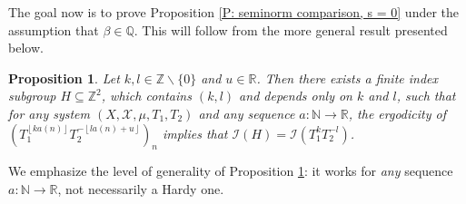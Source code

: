 \documentclass[11pt]{amsart}
\newtheorem{proposition}[lemma]{Proposition}
\theoremstyle{definition}
\newcommand{\N}{{\mathbb N}}
\newcommand{\Q}{{\mathbb Q}}
\newcommand{\R}{{\mathbb R}}
\newcommand{\CI}{{\mathcal I}}
\newcommand{\CX}{{\mathcal X}}
\newcommand{\1}{{\mathbf{1}}}
\newcommand{\floor}[1]{{\left \lfloor #1 \right \rfloor}}
\begin{document}

The goal now is to prove Proposition \ref{P: seminorm comparison, s = 0} under the assumption that $\beta\in\Q$. This will follow from the more general result presented below.

\begin{proposition}\label{P: beta rational}
    Let $k,l\in\mathbb{Z}\backslash\{0\}$ and $u\in\R$. Then there exists a finite index subgroup $H\subseteq\mathbb{Z}^{2}$, which contains $(k,l)$ and depends only on $k$ and $l$, such that for any system $(X,\CX,\mu, T_{1},T_{2})$ and any sequence $a\colon\mathbb{N}\to\mathbb{R}$, the ergodicity of $(T_{1}^{\floor{ka(n)}}T_{2}^{-\floor{la(n)+u}})_{n}$ implies that $\CI(H)=\CI(T_{1}^{k}T_{2}^{-l})$.   
\end{proposition}
We emphasize the level of generality of Proposition \ref{P: beta rational}: it works for \textit{any} sequence $a:\N\to\R$, not necessarily a Hardy one. %
\end{document}
